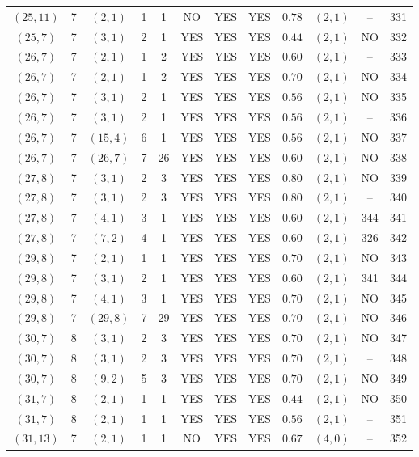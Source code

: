 \begin{longtable}{|c|c|c|c|c|c|c|c|c|c|c|c|}
$(25,11)$ & 7 & $(2,1)$ & 1 & 1 & NO & YES & YES & $0.78$ & $(2,1)$ & -- & 331\\
$(25,7)$ & 7 & $(3,1)$ & 2 & 1 & YES & YES & YES & $0.44$ & $(2,1)$ & NO & 332\\
$(26,7)$ & 7 & $(2,1)$ & 1 & 2 & YES & YES & YES & $0.60$ & $(2,1)$ & -- & 333\\
$(26,7)$ & 7 & $(2,1)$ & 1 & 2 & YES & YES & YES & $0.70$ & $(2,1)$ & NO & 334\\
$(26,7)$ & 7 & $(3,1)$ & 2 & 1 & YES & YES & YES & $0.56$ & $(2,1)$ & NO & 335\\
$(26,7)$ & 7 & $(3,1)$ & 2 & 1 & YES & YES & YES & $0.56$ & $(2,1)$ & -- & 336\\
$(26,7)$ & 7 & $(15,4)$ & 6 & 1 & YES & YES & YES & $0.56$ & $(2,1)$ & NO & 337\\
$(26,7)$ & 7 & $(26,7)$ & 7 & 26 & YES & YES & YES & $0.60$ & $(2,1)$ & NO & 338\\
$(27,8)$ & 7 & $(3,1)$ & 2 & 3 & YES & YES & YES & $0.80$ & $(2,1)$ & NO & 339\\
$(27,8)$ & 7 & $(3,1)$ & 2 & 3 & YES & YES & YES & $0.80$ & $(2,1)$ & -- & 340\\
$(27,8)$ & 7 & $(4,1)$ & 3 & 1 & YES & YES & YES & $0.60$ & $(2,1)$ & 344 & 341\\
$(27,8)$ & 7 & $(7,2)$ & 4 & 1 & YES & YES & YES & $0.60$ & $(2,1)$ & 326 & 342\\
$(29,8)$ & 7 & $(2,1)$ & 1 & 1 & YES & YES & YES & $0.70$ & $(2,1)$ & NO & 343\\
$(29,8)$ & 7 & $(3,1)$ & 2 & 1 & YES & YES & YES & $0.60$ & $(2,1)$ & 341 & 344\\
$(29,8)$ & 7 & $(4,1)$ & 3 & 1 & YES & YES & YES & $0.70$ & $(2,1)$ & NO & 345\\
$(29,8)$ & 7 & $(29,8)$ & 7 & 29 & YES & YES & YES & $0.70$ & $(2,1)$ & NO & 346\\
$(30,7)$ & 8 & $(3,1)$ & 2 & 3 & YES & YES & YES & $0.70$ & $(2,1)$ & NO & 347\\
$(30,7)$ & 8 & $(3,1)$ & 2 & 3 & YES & YES & YES & $0.70$ & $(2,1)$ & -- & 348\\
$(30,7)$ & 8 & $(9,2)$ & 5 & 3 & YES & YES & YES & $0.70$ & $(2,1)$ & NO & 349\\
$(31,7)$ & 8 & $(2,1)$ & 1 & 1 & YES & YES & YES & $0.44$ & $(2,1)$ & NO & 350\\
$(31,7)$ & 8 & $(2,1)$ & 1 & 1 & YES & YES & YES & $0.56$ & $(2,1)$ & -- & 351\\
$(31,13)$ & 7 & $(2,1)$ & 1 & 1 & NO & YES & YES & $0.67$ & $(4,0)$ & -- & 352\\

\end{longtable}
